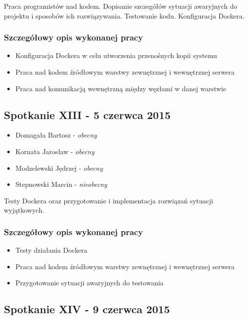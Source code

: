 \par{Praca programistów nad kodem. Dopisanie szczegółów sytuacji awaryjnych do projektu i sposobów ich rozwiązywania. Testowanie kodu. Konfiguracja Dockera.}

\subsubsection*[Szczegółowy opis wykonanej pracy]{Szczegółowy opis wykonanej pracy}
\begin{itemize}
\item Konfiguracja Dockera w celu utworzenia przenośnych kopii systemu
\item Praca nad kodem źródłowym warstwy zewnętrznej i wewnętrznej serwera
\item Praca nad komunikacją wewnętrzną między węzłami w danej warstwie
\end{itemize}

\subsection[Spotkanie XIII - 5 czerwca 2015]{Spotkanie XIII - 5 czerwca 2015}

\begin{itemize}
\item Domagała Bartosz - \textit{obecny}
\item Kornata Jarosław - \textit{obecny}
\item Modzelewski Jędrzej - \textit{obecny}
\item Stepnowski Marcin - \textit{nieobecny}
\end{itemize}

\par{Testy Dockera oraz przygotowanie i implementacja rozwiązań sytuacji wyjątkowych.}

\subsubsection*[Szczegółowy opis wykonanej pracy]{Szczegółowy opis wykonanej pracy}
\begin{itemize}
\item Testy działania Dockera
\item Praca nad kodem źródłowym warstwy zewnętrznej i wewnętrznej serwera
\item Przygotowanie sytuacji awaryjnych do testowania
\end{itemize}

\subsection[Spotkanie XIV - 9 czerwca 2015]{Spotkanie XIV - 9 czerwca 2015}

